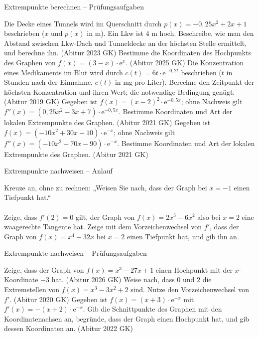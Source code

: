 \begin{aufgabe}{Extrempunkte berechnen – Prüfungsaufgaben}
\begin{teile}
\teil Die Decke eines Tunnels wird im Querschnitt durch $p(x) = -0{,}25x^2 + 2x + 1$ beschrieben ($x$ und $p(x)$ in m). Ein Lkw ist $4$ m hoch. Beschreibe, wie man den Abstand zwischen Lkw-Dach und Tunneldecke an der höchsten Stelle ermittelt, und berechne ihn. \hfill (Abitur 2023 GK)
\teil Bestimme die Koordinaten des Hochpunkts des Graphen von $f(x) = (3 - x) \cdot \mathrm{e}^{x}$. \hfill (Abitur 2025 GK)
\teil Die Konzentration eines Medikaments im Blut wird durch $c(t) = 6t \cdot \mathrm{e}^{-0{,}2t}$ beschrieben ($t$ in Stunden nach der Einnahme, $c(t)$ in mg pro Liter). Berechne den Zeitpunkt der höchsten Konzentration und ihren Wert; die notwendige Bedingung genügt. \hfill (Abitur 2019 GK)
\teil Gegeben ist $f(x) = (x - 2)^2 \cdot \mathrm{e}^{-0{,}5x}$; ohne Nachweis gilt $f''(x) = (0{,}25x^2 - 3x + 7) \cdot \mathrm{e}^{-0{,}5x}$. Bestimme Koordinaten und Art der lokalen Extrempunkte des Graphen. \hfill (Abitur 2021 GK)
\teil Gegeben ist $f(x) = (-10x^2 + 30x - 10) \cdot \mathrm{e}^{-x}$; ohne Nachweis gilt $f''(x) = (-10x^2 + 70x - 90) \cdot \mathrm{e}^{-x}$. Bestimme Koordinaten und Art der lokalen Extrempunkte des Graphen. \hfill (Abitur 2021 GK)
\end{teile}
\end{aufgabe}

\begin{aufgabe}{Extrempunkte nachweisen – Anlauf}
\begin{teile}
\teil Kreuze an, ohne zu rechnen: „Weisen Sie nach, dass der Graph bei $x = -1$ einen Tiefpunkt hat.“ \\  \\ 
\teil Zeige, dass $f'(2) = 0$ gilt, der Graph von $f(x) = 2x^3 - 6x^2$ also bei $x = 2$ eine waagerechte Tangente hat.
\teil Zeige mit dem Vorzeichenwechsel von $f'$, dass der Graph von $f(x) = x^4 - 32x$ bei $x = 2$ einen Tiefpunkt hat, und gib ihn an.
\end{teile}
\end{aufgabe}

\begin{aufgabe}{Extrempunkte nachweisen – Prüfungsaufgaben}
\begin{teile}
\teil Zeige, dass der Graph von $f(x) = x^3 - 27x + 1$ einen Hochpunkt mit der $x$-Koordinate $-3$ hat. \hfill (Abitur 2026 GK)
\teil Weise nach, dass $0$ und $2$ die Extremstellen von $f(x) = x^3 - 3x^2 + 2$ sind. Nutze den Vorzeichenwechsel von $f'$. \hfill (Abitur 2020 GK)
\teil Gegeben ist $f(x) = (x + 3) \cdot \mathrm{e}^{-x}$ mit $f'(x) = -(x + 2) \cdot \mathrm{e}^{-x}$. Gib die Schnittpunkte des Graphen mit den Koordinatenachsen an, begründe, dass der Graph einen Hochpunkt hat, und gib dessen Koordinaten an. \hfill (Abitur 2022 GK)
\end{teile}
\end{aufgabe}

